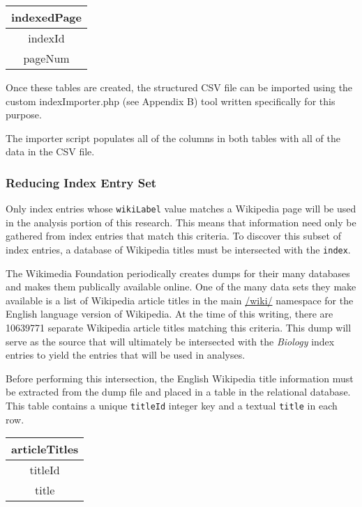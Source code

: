 \begin{center}
\begin{tabular}{|c|}
\hline 
\textbf{indexedPage} \\ 
\hline 
indexId \\ 
\hline 
pageNum \\ 
\hline 
\end{tabular} 
\end{center}

Once these tables are created, the structured CSV file can be imported using the custom indexImporter.php (see Appendix B) tool written specifically for this purpose.

The importer script populates all of the columns in both tables with all of the data in the CSV file.

\subsubsection{Reducing Index Entry Set}
\label{subsec:reducing}

Only index entries whose {\tt wikiLabel} value matches a Wikipedia page will be used in the analysis portion of this research.
This means that information need only be gathered from index entries that match this criteria.
To discover this subset of index entries, a database of Wikipedia titles must be intersected with the {\tt index}.

The Wikimedia Foundation periodically creates dumps for their many databases and makes them publically available online\cite{wiki-dumps}.
One of the many data sets they make available is a list of Wikipedia article titles in the main \url{/wiki/} namespace for the English language version of Wikipedia\cite{wiki-dump-titles}.
At the time of this writing, there are 10639771 separate Wikipedia article titles matching this criteria.
This dump will serve as the source that will ultimately be intersected with the {\it Biology} index entries to yield the entries that will be used in analyses.

Before performing this intersection, the English Wikipedia title information must be extracted from the dump file and placed in a table in the relational database.
This table contains a unique {\tt titleId} integer key and a textual {\tt title} in each row.

\begin{center}
\begin{tabular}{|c|}
\hline 
{\bf articleTitles} \\ 
\hline 
titleId \\ 
\hline 
title \\ 
\hline 
\end{tabular} 
\end{center}

